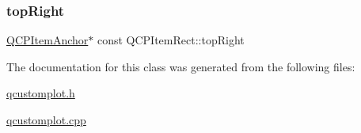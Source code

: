 \subsubsection{\texorpdfstring{top\+Right}{topRight}}
{\footnotesize\ttfamily \hyperlink{class_q_c_p_item_anchor}{Q\+C\+P\+Item\+Anchor}$\ast$ const Q\+C\+P\+Item\+Rect\+::top\+Right}



The documentation for this class was generated from the following files\+:\begin{DoxyCompactItemize}
\item 
\hyperlink{qcustomplot_8h}{qcustomplot.\+h}\item 
\hyperlink{qcustomplot_8cpp}{qcustomplot.\+cpp}\end{DoxyCompactItemize}
